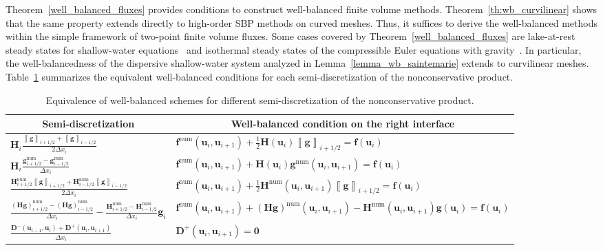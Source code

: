 \documentclass[]{scrartcl}
\renewcommand{\vec}[1]{\boldsymbol{#1}}
\newcommand{\jump}[1]{\left\llbracket #1  \right\rrbracket}
\theoremstyle{definition}
\begin{document}
Theorem~\ref{well_balanced_fluxes} provides conditions to construct well-balanced finite volume methods.
Theorem~\ref{th:wb_curvilinear} shows that the same property extends directly to high-order SBP methods on curved meshes.
Thus, it suffices to derive the well-balanced methods within the simple framework of two-point finite volume fluxes.
Some cases covered by Theorem~\ref{well_balanced_fluxes} are lake-at-rest steady states for shallow-water equations~\cite{FJORDHOLM20115587, gassner2016shallowwater, Ranocha2017} and isothermal steady states of the compressible Euler equations with gravity~\cite{WARUSZEWSKI2022111507, artiano2025structurepreservinghighordermethodscompressible,ChandrashekarWB}.
In particular, the well-balancedness of the dispersive shallow-water system analyzed in Lemma~\ref{lemma_wb_saintemarie} extends to curvilinear meshes.
Table~\ref{table_wb} summarizes the equivalent well-balanced conditions for each semi-discretization of the nonconservative product.

\begin{table}[htbp]
\centering
  \caption{Equivalence of well-balanced schemes for different semi-discretization of the nonconservative product.}
  \label{table_wb}
  \centering
  \small
    \begin{tabular}{ll}
      \toprule
       \multicolumn{1}{c}{Semi-discretization}
      & \multicolumn{1}{c}{Well-balanced condition on the right interface}\\
      \midrule
 $\vec{H}_i\frac{\jump{\vec{g}}_{i+1/2} + \jump{\vec{g}}_{i-1/2}}{2 \Delta x_i}$
& $ \vec{f}^\mathrm{num}(\vec{u}_i,\vec{u}_{i+1}) +\frac{1}{2}\vec{H}(\vec{u}_i) \jump{\vec{g}}_{i+1/2} = \vec{f}(\vec{u}_i)$
\\
 $\vec{H}_i \frac{\vec{g}_{i+1/2}^{\mathrm{num}} - \vec{g}^{\mathrm{num}}_{i-1/2}}{\Delta x_i}$
& $\vec{f}^{\mathrm{num}}(\vec{u}_i, \vec{u}_{i+1}) + \vec{H}(\vec{u}_i)\vec{g}^{\mathrm{num}}(\vec{u}_i, \vec{u}_{i+1}) = \vec{f}(\vec{u}_i)$
\\
 $\frac{\vec{H}^{\mathrm{num}}_{i+1/2} \jump{\vec{g}}_{i+1/2} + \vec{H}^{\mathrm{num}}_{i-1/2} \jump{\vec{g}}_{i-1/2}}{2 \Delta x_i}$
& $\vec{f}^\mathrm{num}(\vec{u}_i,\vec{u}_{i+1}) +\frac{1}{2}\vec{H}^{\mathrm{num}}(\vec{u}_i,\vec{u}_{i+1}) \jump{\vec{g}}_{i+1/2} = \vec{f}(\vec{u}_i)$
\\
 $\frac{\left (\vec{H} \vec{g} \right ) ^{\mathrm{num}}_{i+1/2} - \left (\vec{H} \vec{g} \right ) ^{\mathrm{num}}_{i-1/2}}{\Delta x_i} - \frac{\vec{H}^{\mathrm{num}}_{i+1/2} - \vec{H}^{\mathrm{num}}_{i-1/2}}{\Delta x_i} \vec{g}_i$
& $\vec{f}^\mathrm{num}(\vec{u}_i,\vec{u}_{i+1}) +\left ( \vec{H} \vec{g} \right ) ^{\mathrm{num}}(\vec{u}_i,\vec{u}_{i+1}) - \vec{H}^{\mathrm{num}}(\vec{u}_i, \vec{u}_{i+1}) \vec{g}(\vec{u}_i) = \vec{f}(\vec{u}_i)$ \\
$\frac{\vec{D}^-(\vec{u}_{i-1},\vec{u}_i) + \vec{D}^+(\vec{u}_i, \vec{u}_{i+1})}{\Delta x_i}$ & $\vec{D}^+(\vec{u}_i, \vec{u}_{i+1}) = \vec{0}$\\ 
      \bottomrule
    \end{tabular}
\end{table}
\end{document}
